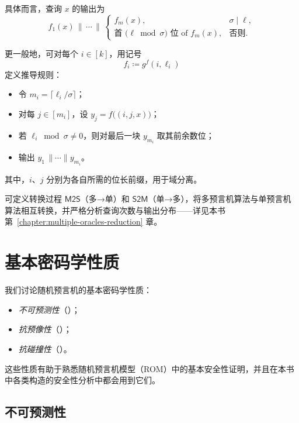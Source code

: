 \documentclass[american,singlepageview]{snargs-book-zh}
\newcommand{\DefineEqual}{\coloneqq}
\newcommand{\ROFunction}{f}
\newcommand{\ROVectorLength}{k}
\newcommand{\ROQuery}{x}
\newcommand{\ROAnswer}{y}
\newcommand{\ROOutputSize}{\sigma}
\newcommand{\ROChosenOutputSize}{\ell}
\newcommand{\RONumOutputChunks}{m}
\newcommand{\MultiToSingle}{\mathsf{M2S}}
\newcommand{\SingleToMulti}{\mathsf{S2M}}
\newcommand{\DeriveROFunction}[3]{g^{#1}(#2,#3)}
\begin{document}
具体而言，查询 $\ROQuery$ 的输出为
\[
\ROFunction_{1}(\ROQuery)\,\|\,\cdots\,\|\,
\begin{cases}
\ROFunction_{\RONumOutputChunks}(\ROQuery), & \ROOutputSize\mid\ROChosenOutputSize,\\
\text{首 }\bigl(\ROChosenOutputSize\bmod\ROOutputSize\bigr)\text{ 位 of }\ROFunction_{\RONumOutputChunks}(\ROQuery), & \text{否则.}
\end{cases}
\]

更一般地，可对每个 $i\in[\ROVectorLength]$，用记号
\[
\ROFunction_{i}\DefineEqual\DeriveROFunction{\ROFunction}{i}{\ROChosenOutputSize_{i}}
\]
定义推导规则：
\begin{itemize}[noitemsep]
  \item 令 $\RONumOutputChunks_{i}=\lceil\ROChosenOutputSize_{i}/\ROOutputSize\rceil$；
  \item 对每 $j\in[\RONumOutputChunks_{i}]$，设 $\ROAnswer_{j}=\ROFunction\bigl((i,j,\ROQuery)\bigr)$；
  \item 若 $\ROChosenOutputSize_{i}\bmod\ROOutputSize\neq0$，则对最后一块 $\ROAnswer_{\RONumOutputChunks_{i}}$ 取其前余数位；
  \item 输出 $\ROAnswer_{1}\,\|\cdots\|\ROAnswer_{\RONumOutputChunks_{i}}$。
\end{itemize}
其中，$i$、$j$ 分别为各自所需的位长前缀，用于域分离。

可定义转换过程 $\MultiToSingle$（多→单）和 $\SingleToMulti$（单→多），将多预言机算法与单预言机算法相互转换，并严格分析查询次数与输出分布——详见本书第~\ref{chapter:multiple-oracles-reduction} 章。

\chapter{基本密码学性质}
\label{chapter:rom-basic-properties}

我们讨论随机预言机的基本密码学性质：
\begin{itemize}[noitemsep]
  \item \emph{不可预测性}（）；
  \item \emph{抗预像性}（）；
  \item \emph{抗碰撞性}（）。
\end{itemize}
这些性质有助于熟悉随机预言机模型（ROM）中的基本安全性证明，并且在本书中各类构造的安全性分析中都会用到它们。

\section{不可预测性}
\label{section:unpredictability}
\end{document}
